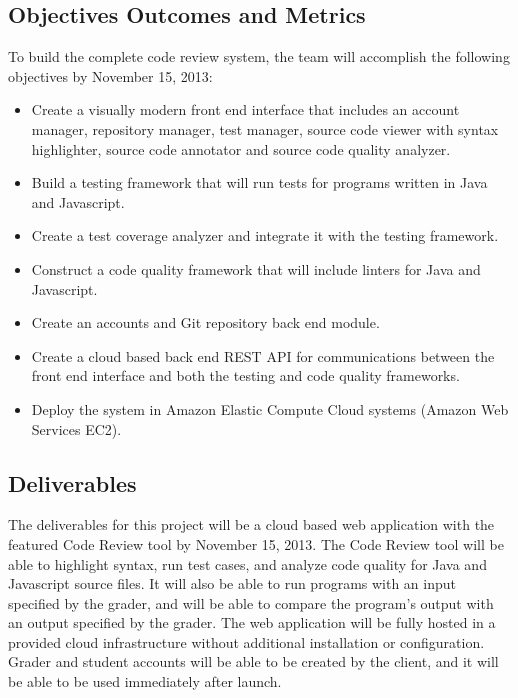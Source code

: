 
\subsection{Objectives Outcomes and Metrics}
To build the complete code review system, the team will accomplish the following
objectives by November 15, 2013:

\begin{itemize}
\item Create a visually modern front end interface that includes an account
manager, repository manager, test manager, source code viewer with syntax
highlighter, source code annotator and source code quality analyzer.

\item Build a testing framework that will run tests for programs written in 
Java and Javascript.

\item Create a test coverage analyzer and integrate it with the testing
framework.

\item Construct a code quality framework that will include linters for Java
and Javascript.

\item Create an accounts and Git repository back end module.

\item Create a cloud based back end REST API for communications between the
front end interface and both the testing and code quality frameworks.

\item Deploy the system in Amazon Elastic Compute Cloud systems (Amazon Web
Services EC2).

\end{itemize}
\subsection{Deliverables}

The deliverables for this project will be a cloud based web application with the
featured Code Review tool by November 15, 2013. The Code Review tool will be
able to highlight syntax, run test cases, and analyze code quality for Java
and Javascript source files. It will also be able to run programs with an input
specified by the grader, and will be able to compare the program's output with
an output specified by the grader. The web application will be fully hosted in a
provided cloud infrastructure without additional installation or configuration.
Grader and student accounts will be able to be created by the client, and it
will be able to be used immediately after launch.

